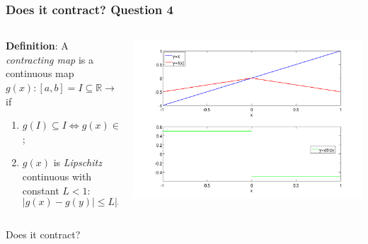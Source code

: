 \documentclass{beamer}
\begin{document}
\begin{frame}
\frametitle{Does it contract? Question 4}

\begin{columns}
    \begin{column}{0.45\textwidth}
  {\bf Definition}: A \emph{contracting map} is a continuous map
  $g(x) : [a, b] = I \subseteq \mathbb{R} \rightarrow \mathbb{R}$ if
\begin{enumerate}
  \item $g(I) \subseteq I \Leftrightarrow g(x) \in I \, \, \, \forall
    x \in I$;
  \item $g(x)$ is \emph{Lipschitz} continuous with constant $L < 1$:
    \begin{equation*}
      | g(x) - g(y) | \leq L | x - y | \, \, \, \forall x, y \in I.
    \end{equation*}
  \end{enumerate}
\end{column}
\begin{column}{0.55\textwidth}
  \begin{center}
   \includegraphics[width=\textwidth]{figures/cmap4}
  \end{center}
\end{column}
\end{columns}
\begin{overlayarea}{\textwidth}{0.1\textheight}
Does it contract?
\end{overlayarea}
\end{frame}
\end{document}
